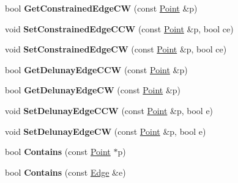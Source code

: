 \begin{DoxyCompactItemize}
\item 
\mbox{\label{classp2t_1_1Triangle_aa68564476215938a9c27efd3998f3edc}} 
bool {\bfseries Get\+Constrained\+Edge\+CW} (const \hyperlink{structp2t_1_1Point}{Point} \&p)
\item 
\mbox{\label{classp2t_1_1Triangle_a428d2e75df9f4c51a4b69b9fdc70f052}} 
void {\bfseries Set\+Constrained\+Edge\+C\+CW} (const \hyperlink{structp2t_1_1Point}{Point} \&p, bool ce)
\item 
\mbox{\label{classp2t_1_1Triangle_a3ad12459aeda58122935c69b0657db07}} 
void {\bfseries Set\+Constrained\+Edge\+CW} (const \hyperlink{structp2t_1_1Point}{Point} \&p, bool ce)
\item 
\mbox{\label{classp2t_1_1Triangle_ad5adaf18430c505ab62b7c75413135ed}} 
bool {\bfseries Get\+Delunay\+Edge\+C\+CW} (const \hyperlink{structp2t_1_1Point}{Point} \&p)
\item 
\mbox{\label{classp2t_1_1Triangle_ad09c511139fc9ec27fc0f6eeff38829f}} 
bool {\bfseries Get\+Delunay\+Edge\+CW} (const \hyperlink{structp2t_1_1Point}{Point} \&p)
\item 
\mbox{\label{classp2t_1_1Triangle_ad3b7f67e5a08e26bf974f5a2d06c15ce}} 
void {\bfseries Set\+Delunay\+Edge\+C\+CW} (const \hyperlink{structp2t_1_1Point}{Point} \&p, bool e)
\item 
\mbox{\label{classp2t_1_1Triangle_a5d9844fcc2d8ad3ce2643520f1f62aaf}} 
void {\bfseries Set\+Delunay\+Edge\+CW} (const \hyperlink{structp2t_1_1Point}{Point} \&p, bool e)
\item 
\mbox{\label{classp2t_1_1Triangle_a93282c9e5203a8b1293c17f854be597b}} 
bool {\bfseries Contains} (const \hyperlink{structp2t_1_1Point}{Point} $\ast$p)
\item 
\mbox{\label{classp2t_1_1Triangle_a6f591a1d0eeea1199f522f5613bab5a3}} 
bool {\bfseries Contains} (const \hyperlink{structp2t_1_1Edge}{Edge} \&e)
\item 
\mbox{\label{classp2t_1_1Triangle_ae4a8991cd524e3f541c9c02dd86bce55}} 

\end{DoxyCompactItemize}
